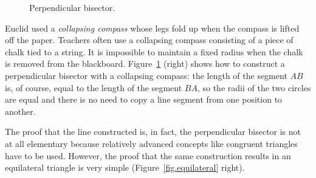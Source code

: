\documentclass[11pt,a4paper]{article}
\begin{document}
\begin{figure}[H]
\begin{center}
\caption{Perpendicular bisector.}\label{fig.bisector}
\end{center}
\end{figure}
\vspace*{-3ex}
Euclid used a \emph{collapsing compass} whose legs fold up when the compass is lifted off the paper. Teachers often use a collapsing compass consisting of a piece of chalk tied to a string. It is impossible to maintain a fixed radius when the chalk is removed from the blackboard. Figure~\ref{fig.bisector} (right) shows how to construct a perpendicular bisector with a collapsing compass: the length of the segment $AB$ is, of course, equal to the length of the segment $BA$, so the radii of the two circles are equal and there is no need to copy a line segment from one position to another.

The proof that the line constructed is, in fact, the perpendicular bisector is not at all elementary because relatively advanced concepts like congruent triangles have to be used. However, the proof that the same construction results in an equilateral triangle is very simple (Figure~\ref{fig.equilateral} right).
\end{document}
